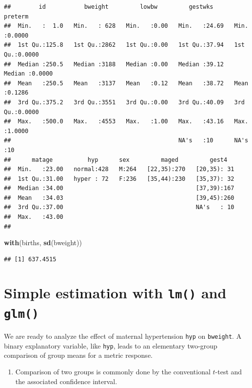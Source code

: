 \documentclass[
]{book}
\newenvironment{Shaded}{\begin{snugshade}}{\end{snugshade}}
\newcommand{\FunctionTok}[1]{\textcolor[rgb]{0.13,0.29,0.53}{\textbf{#1}}}
\newcommand{\NormalTok}[1]{#1}
\providecommand{\tightlist}{%
  \setlength{\itemsep}{0pt}\setlength{\parskip}{0pt}}
\begin{document}
\begin{verbatim}
##        id           bweight         lowbw         gestwks         preterm      
##  Min.   :  1.0   Min.   : 628   Min.   :0.00   Min.   :24.69   Min.   :0.0000  
##  1st Qu.:125.8   1st Qu.:2862   1st Qu.:0.00   1st Qu.:37.94   1st Qu.:0.0000  
##  Median :250.5   Median :3188   Median :0.00   Median :39.12   Median :0.0000  
##  Mean   :250.5   Mean   :3137   Mean   :0.12   Mean   :38.72   Mean   :0.1286  
##  3rd Qu.:375.2   3rd Qu.:3551   3rd Qu.:0.00   3rd Qu.:40.09   3rd Qu.:0.0000  
##  Max.   :500.0   Max.   :4553   Max.   :1.00   Max.   :43.16   Max.   :1.0000  
##                                                NA's   :10      NA's   :10      
##      matage          hyp      sex         maged         gest4    
##  Min.   :23.00   normal:428   M:264   [22,35):270   [20,35): 31  
##  1st Qu.:31.00   hyper : 72   F:236   [35,44):230   [35,37): 32  
##  Median :34.00                                      [37,39):167  
##  Mean   :34.03                                      [39,45):260  
##  3rd Qu.:37.00                                      NA's   : 10  
##  Max.   :43.00                                                   
## 
\end{verbatim}

\begin{Shaded}
\begin{Highlighting}[]
\FunctionTok{with}\NormalTok{(births, }\FunctionTok{sd}\NormalTok{(bweight))}
\end{Highlighting}
\end{Shaded}

\begin{verbatim}
## [1] 637.4515
\end{verbatim}

\section{\texorpdfstring{Simple estimation with \texttt{lm()} and \texttt{glm()}}{Simple estimation with lm() and glm()}}\label{simple-estimation-with-lm-and-glm}

We are ready to analyze the effect of maternal hypertension \texttt{hyp} on \texttt{bweight}.
A binary explanatory variable, like \texttt{hyp}, leads to an elementary
two-group comparison of group
means for a metric response.

\begin{enumerate}
\def\labelenumi{\arabic{enumi}.}
\tightlist
\item
  Comparison of two groups is commonly done by the conventional \(t\)-test and
  the associated confidence interval.
\end{enumerate}
\end{document}
